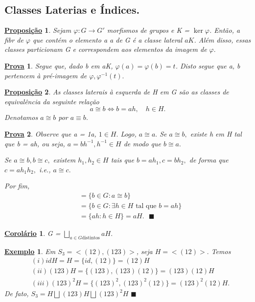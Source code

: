 \documentclass{article}
\newtheorem*{prop*}{\underline{Proposi\c c\~ao}}
\newtheorem*{crl*}{\underline{Corol\'ario}}
\newtheorem{example*}{\underline{Exemplo}}
\newtheorem*{proof*}{\underline{Prova}}
\renewcommand\qedsymbol{$\blacksquare$}
\begin{document}
\subsection{Classes Laterias e \'Indices.}
\begin{prop*}
  Sejam $\varphi:G\rightarrow G'$ morfismos de grupos e K = $\ker{\varphi}$. Ent\~ao, a fibr de $\varphi$ que cont\'em o elemento a
a de G \'e a classe lateral $aK$. Al\'em disso, essas classes particionam G e correspondem aos elementos da imagem de $\varphi.$
\end{prop*}
\begin{proof*}
  Segue que, dado b em aK, $\varphi(a) = \varphi(b) = t$. Disto segue que a, b pertencem \`a pr\'e-imagem de $\varphi, \varphi^{-1}(t).$
\end{proof*}
\begin{prop*}
  As classes laterais \`a esquerda de H em G s\~ao as classes de equival\^encia da seguinte rela\c c\~ao 
    $$
      a\cong{b} \Longleftrightarrow b = ah, \quad h\in H.
    $$
  Denotamos $a\cong{b}$ por $a\equiv b.$
\end{prop*}
\begin{proof*}
  Observe que a = 1a, $1\in H.$ Logo, $a\cong{a}.$ Se $a\cong{b},$ existe h em H tal que b = ah, ou seja, $a = bh^{-1}, h^{-1}\in H$ 
de modo que $b\cong{a}.$ 

  Se $a\cong{b}, b\cong{c},$ existem $h_{1}, h_{2}\in H$ tais que $b = ah_{1}, c = bh_{2},$ de forma que $c = ah_{1}h_{2},$ i.e.,
 $a\cong{c}.$ 

  Por fim, 
  \begin{align*}
    [a] &= \{b\in G: a\cong{b}\}\\
        &= \{b\in G: \exists h\in H\text{ tal que }b = ah\}\\
        &= \{ah: h \in H\} = aH.\text{ \qedsymbol}
  \end{align*}
\end{proof*}
\begin{crl*}
  G = $\bigsqcup_{a\in G\text{distintos}}^{}{aH}.$
\end{crl*}
\begin{example*}
  Em $S_{3} = <(12), (123)>$, seja $H = <(12)>.$ Temos 
 \begin{align*}
   &(i)id H = H = \{id, (12)\} = (12)H\\
   &(ii)(123)H = \{(123), (123)(12)\} = (123)(12)H\\
   &(iii)(123)^{2}H = \{(123)^{2}, (123)^{2}(12)\} = (123)^{2}(12)H.
 \end{align*}
 De fato, $S_{3} = H\bigsqcup_{}^{}{(123)H}\bigsqcup_{}^{}{(123)^{2}H}$ \qedsymbol
\end{example*}
\end{document}
